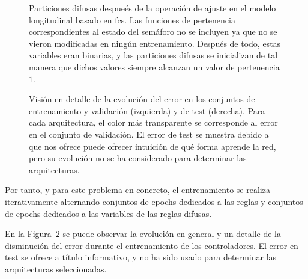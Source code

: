 \begin{figure}[t]
	\centering
	\qquad
	\qquad
	\qquad
	\caption[Particiones difusas después de la operación de ajuste en el modelo longitudinal basado en \ac{fcs}]{Particiones difusas despueés de la operación de ajuste en el modelo longitudinal basado en \ac{fcs}. Las funciones de pertenencia correspondientes al estado del semáforo no se incluyen ya que no se vieron modificadas en ningún entrenamiento. Después de todo, estas variables eran binarias, y las particiones difusas se inicializan de tal manera que dichos valores siempre alcanzan un valor de pertenencia $1$.}
	\label{fig:adjusted-fuzzy-partitions}
\end{figure}

\begin{figure}[!b]
	\centering
	\qquad
	\caption[Evolución del error durante el entrenamiento en las arquitecturas de \ac{fcs} para el modelo longitudinal]{Visión en detalle de la evolución del error en los conjuntos de entrenamiento y validación (izquierda) y de test (derecha). Para cada arquitectura, el color más transparente se corresponde al error en el conjunto de validación. El error de test se muestra debido a que nos ofrece puede ofrecer intuición de qué forma aprende la red, pero su evolución no se ha considerado para determinar las arquitecturas.}
	\label{fig:lm-fcs-rmse-all-comparisons}
\end{figure}

Por tanto, y para este problema en concreto, el entrenamiento se realiza iterativamente alternando conjuntos de epochs dedicados a las reglas y conjuntos de epochs dedicados a las variables de las reglas difusas.

En la Figura~\ref{fig:lm-fcs-rmse-all-comparisons} se puede observar la evolución en general y un detalle de la disminución del error durante el entrenamiento de los controladores. El error en test se ofrece a título informativo, y no ha sido usado para determinar las arquitecturas seleccionadas.

